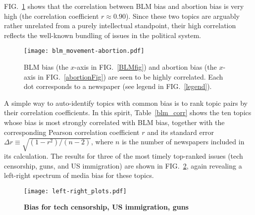 \documentclass[10pt,letterpaper]{article}
\def\fig#1{FIG.~\ref{#1}}
\def\Fig#1{FIG.~\ref{#1}}
\def\tabl#1{Table~\ref{#1}}
\begin{document}
\Fig{BLMabortionCorrFig} shows that the correlation between BLM bias and abortion bias is very high (the correlation coefficient $r\approx 0.90$). Since these two topics are arguably rather unrelated from a purely intellectual standpoint, their high correlation reflects the well-known bundling of issues in the political system.

\begin{figure}[tb]
\caption{BLM bias (the $x$-axis in \protect\fig{BLMfig}) and abortion bias  (the $x$-axis in \protect\fig{abortionFig}) are seen to be highly correlated. Each dot corresponds to a newspaper (see legend in \protect\fig{legend}).}
\centerline{\texttt{[image: blm\_movement-abortion.pdf]}}
\label{BLMabortionCorrFig}
\end{figure}

A simple way to auto-identify topics with common bias is to rank topic pairs by their correlation coefficients. 
In this spirit, \tabl{blm_corr} shows the ten topics whose bias is most strongly correlated with BLM bias, together with the corresponding Pearson correlation coefficient $r$ and its standard error
$\Delta r\equiv\sqrt{(1 - r^2)/(n - 2)}$,
where $n$ is the number of newspapers included in its calculation.
The results for three of the most timely top-ranked issues (tech censorship, guns, and US immigration) are shown in \fig{lr_3plots},
again revealing a left-right spectrum of media bias for these topics.





\clearpage

\begin{figure}[ht]
\caption{{\bf Bias for tech censorship, US immigration, guns} 
}
\hglue-5cm 
\texttt{[image: left-right\_plots.pdf]}\label{lr_3plots}
\end{figure}

\clearpage
\end{document}
